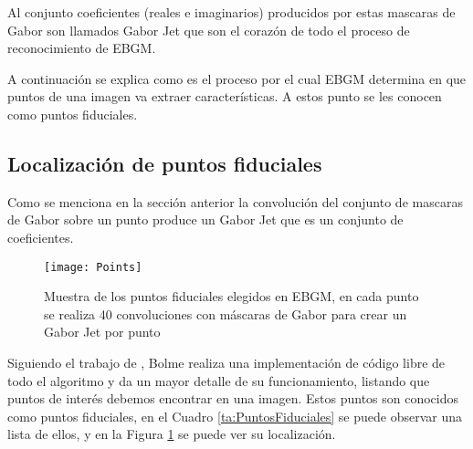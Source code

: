 Al conjunto coeficientes (reales e imaginarios) producidos por estas mascaras de Gabor son llamados Gabor Jet que son el corazón de todo el proceso de reconocimiento de \ac{EBGM}.

A continuación se explica como es el proceso por el cual \ac{EBGM} determina en que puntos de una imagen va extraer características. A estos punto se les conocen como puntos fiduciales.

\subsection{Localización de puntos fiduciales}
Como se menciona en la sección anterior la convolución del conjunto de mascaras de Gabor sobre un punto produce un Gabor Jet que es un conjunto de coeficientes.

\begin{figure}[h]
\center
\texttt{[image: Points]}
\caption{Muestra de los puntos fiduciales elegidos en \ac{EBGM}, en cada punto se realiza 40 convoluciones con máscaras de Gabor para crear un Gabor Jet por punto}
\label{im:puntos}
\end{figure}

Siguiendo el trabajo de \cite{wiskott1997face}, Bolme realiza una implementación de código libre de todo el algoritmo y da un mayor detalle de su funcionamiento, listando que puntos de interés debemos encontrar en una imagen. Estos puntos son conocidos como puntos fiduciales, en el Cuadro \ref{ta:PuntosFiduciales} se puede observar una lista de ellos, y en la Figura \ref{im:puntos} se puede ver su localización.


